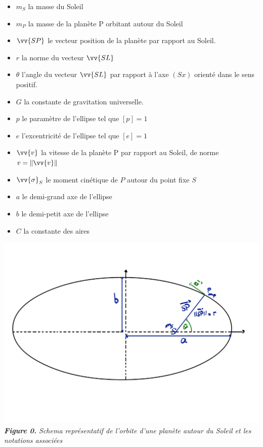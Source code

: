 \documentclass{aa}
\begin{document}
\begin{itemize}
    \item $m_S$ la masse du Soleil \\
    \item $m_P$ la masse de la planète P orbitant autour du Soleil \\
    \item $\vv{SP}$ le vecteur position de la planète par rapport au Soleil. \\ 
    \item $r$ la norme du vecteur $\vv{SL}$ \\
    \item $\theta$ l'angle du vecteur $\vv{SL}$ par rapport à l'axe $\left(Sx\right)$ orienté dans le sens positif.\\
    \item $G$ la constante de gravitation universelle. \\
    \item $p$ le paramètre de l'ellipse tel que $\left[p\right] = 1 $ \\
    \item $e$ l'excentricité de l'ellipse tel que $\left[e\right] = 1 $ \\
    \item $\vv{v}$ la vitesse de la planète P par rapport au Soleil, de norme $v = \| \vv{v} \|$ \\
    \item $\vv{\sigma}_S$ le moment cinétique de $P$ autour du point fixe $S$ \\
    \item $a$ le demi-grand axe de l'ellipse \\
    \item $b$ le demi-petit axe de l'ellipse  \\
    \item $C$ la constante des aires \\
\end{itemize}

\begin{center}
    \includegraphics[scale = 0.17]{images/schema ellipse intro notions png.png} \\
    \emph{\textbf{Figure 0.} Schema représentatif de l'orbite d'une planète autour du Soleil et les notations associées}
\end{center}
\end{document}
